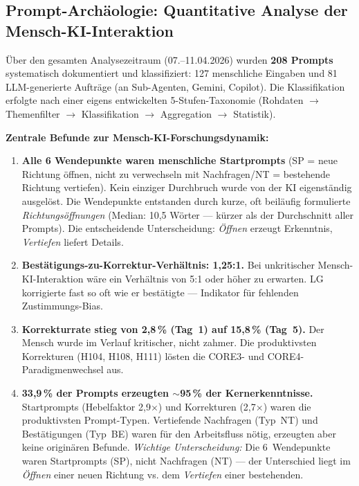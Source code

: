 \documentclass{umbruch-position}
\begin{document}
\subsection*{Prompt-Archäologie: Quantitative Analyse der Mensch-KI-Interaktion}

Über den gesamten Analysezeitraum (07.--11.04.2026) wurden \textbf{208 Prompts} systematisch dokumentiert und klassifiziert: 127 menschliche Eingaben und 81 LLM-generierte Aufträge (an Sub-Agenten, Gemini, Copilot). Die Klassifikation erfolgte nach einer eigens entwickelten 5-Stufen-Taxonomie (Rohdaten $\to$ Themenfilter $\to$ Klassifikation $\to$ Aggregation $\to$ Statistik).

\textbf{Zentrale Befunde zur Mensch-KI-Forschungsdynamik:}

\begin{enumerate}[nosep]
  \item \textbf{Alle 6 Wendepunkte waren menschliche Startprompts} (SP = neue Richtung öffnen, nicht zu verwechseln mit Nachfragen/NT = bestehende Richtung vertiefen). Kein einziger Durchbruch wurde von der KI eigenständig ausgelöst. Die Wendepunkte entstanden durch kurze, oft beiläufig formulierte \textit{Richtungsöffnungen} (Median: 10,5 Wörter --- kürzer als der Durchschnitt aller Prompts). Die entscheidende Unterscheidung: \textit{Öffnen} erzeugt Erkenntnis, \textit{Vertiefen} liefert Details.

  \item \textbf{Bestätigungs-zu-Korrektur-Verhältnis: 1,25:1.} Bei unkritischer Mensch-KI-Interaktion wäre ein Verhältnis von 5:1 oder höher zu erwarten. LG korrigierte fast so oft wie er bestätigte --- Indikator für fehlenden Zustimmungs-Bias.

  \item \textbf{Korrekturrate stieg von 2,8\,\% (Tag~1) auf 15,8\,\% (Tag~5).} Der Mensch wurde im Verlauf kritischer, nicht zahmer. Die produktivsten Korrekturen (H104, H108, H111) lösten die CORE3- und CORE4-Paradigmenwechsel aus.

  \item \textbf{33,9\,\% der Prompts erzeugten ${\sim}$95\,\% der Kernerkenntnisse.} Startprompts (Hebelfaktor 2,9$\times$) und Korrekturen (2,7$\times$) waren die produktivsten Prompt-Typen. Vertiefende Nachfragen (Typ~NT) und Bestätigungen (Typ~BE) waren für den Arbeitsfluss nötig, erzeugten aber keine originären Befunde. \textit{Wichtige Unterscheidung:} Die 6~Wendepunkte waren Startprompts (SP), nicht Nachfragen (NT) --- der Unterschied liegt im \textit{Öffnen} einer neuen Richtung vs. dem \textit{Vertiefen} einer bestehenden.


\end{enumerate}
\end{document}
